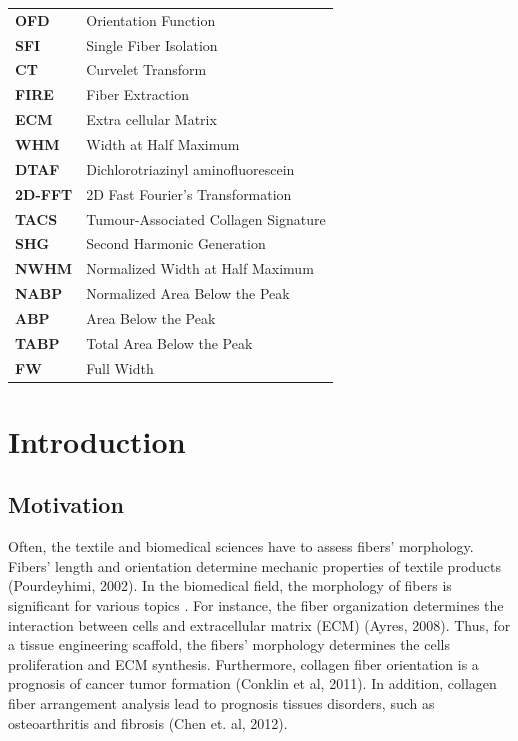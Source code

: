 \documentclass[12pt,a4paper]{article}
\begin{document}
\begin{table}[H]
\begin{center}


\begin{tabular}{ l l }

 \textbf{ OFD } &  Orientation Function  \\
 \textbf{ SFI  } &Single Fiber Isolation  \\
 \textbf{ CT }    & Curvelet Transform  \\
 \textbf{ FIRE  } & Fiber Extraction  \\
 \textbf{ ECM  }  & Extra cellular Matrix  \\
 \textbf{ WHM   } & Width at Half Maximum  \\
 \textbf{ DTAF    } & Dichlorotriazinyl aminoﬂuorescein  \\
 \textbf{ 2D-FFT     } & 2D Fast Fourier’s Transformation  \\
 \textbf{ TACS     } &  Tumour-Associated Collagen Signature  \\
 \textbf{ SHG     } &  Second Harmonic Generation  \\
 \textbf{ NWHM     } &  Normalized Width at Half Maximum  \\
 \textbf{ NABP     } &   Normalized Area Below the Peak \\
 \textbf{ ABP     } &    Area Below the Peak \\
 \textbf{ TABP     } &   Total Area Below the Peak \\
 \textbf{ FW     } &   Full Width \\

 
\end{tabular}
\end{center}
\end{table}

\thispagestyle{empty}
\newpage





\section{Introduction}

\subsection{Motivation}

Often, the textile and biomedical sciences have to assess fibers' morphology.  Fibers' length and orientation determine mechanic properties of textile products (Pourdeyhimi, 2002). In the biomedical field, the morphology of fibers is significant for various topics . For instance, the fiber organization determines the interaction between cells and extracellular matrix (ECM) (Ayres, 2008). Thus, for a tissue engineering scaffold, the fibers' morphology determines the cells proliferation and ECM synthesis. Furthermore, collagen fiber orientation is a prognosis of cancer tumor formation (Conklin et al, 2011). In addition, collagen fiber arrangement analysis lead to prognosis tissues disorders, such as osteoarthritis and fibrosis (Chen et. al, 2012).
\end{document}
